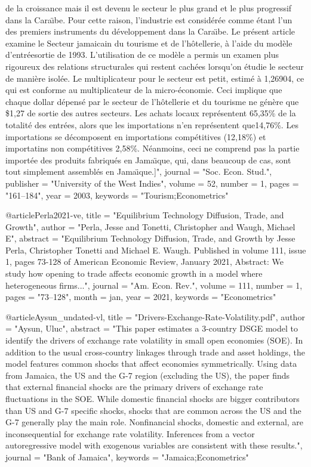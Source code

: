 {{	de la croissance mais il est devenu le secteur le plus grand et
	le plus progressif dans la Cara{\"\i}be. Pour cette raison,
	l'industrie est consid{\'e}r{\'e}e comme {\'e}tant l'un des
	premiers instruments du d{\'e}veloppement dans la Cara{\"\i}be.
	Le pr{\'e}sent article examine le Secteur jamaicain du tourisme
	et de l'h{\^o}tellerie, {\`a} l'aide du mod{\`e}le
	d'entr{\'e}esortie de 1993. L'utilisation de ce mod{\`e}le a
	permis un examen plus rigoureux des relations structurales qui
	restent cach{\'e}es lorsqu'on {\'e}tudie le secteur de
	mani{\`e}re isol{\'e}e. Le multiplicateur pour le secteur est
	petit, estim{\'e} {\`a} 1,26904, ce qui est conforme au
	multiplicateur de la micro-{\'e}conomie. Ceci implique que
	chaque dollar d{\'e}pens{\'e} par le secteur de l'h{\^o}tellerie
	et du tourisme ne g{\'e}n{\`e}re que \$1,27 de sortie des autres
	secteurs. Les achats locaux repr{\'e}sentent 65,35\% de la
	totalit{\'e} des entr{\'e}es, alors que les importations n'en
	repr{\'e}sentent que14,76\%. Les importations se d{\'e}composent
	en importations comp{\'e}titives (12,18\%) et importatins non
	comp{\'e}titives 2,58\%. N{\'e}anmoins, ceci ne comprend pas la
	partie import{\'e}e des produits fabriqu{\'e}s en Jama{\"\i}que,
	qui, dans beaucoup de cas, sont tout simplement assembl{\'e}s en
	Jama{\"\i}que.]",
	journal   = "Soc. Econ. Stud.",
	publisher = "University of the West Indies",
	volume    =  52,
	number    =  1,
	pages     = "161--184",
	year      =  2003,
	keywords  = "Tourism;Econometrics"
}

@article{Perla2021-ve,
	title    = "Equilibrium Technology Diffusion, Trade, and Growth",
	author   = "Perla, Jesse and Tonetti, Christopher and Waugh, Michael E",
	abstract = "Equilibrium Technology Diffusion, Trade, and Growth by Jesse
	Perla, Christopher Tonetti and Michael E. Waugh. Published in
	volume 111, issue 1, pages 73-128 of American Economic Review,
	January 2021, Abstract: We study how opening to trade affects
	economic growth in a model where heterogeneous firms...",
	journal  = "Am. Econ. Rev.",
	volume   =  111,
	number   =  1,
	pages    = "73--128",
	month    =  jan,
	year     =  2021,
	keywords = "Econometrics"
}

@article{Aysun_undated-vl,
	title    = "{Drivers-Exchange-Rate-Volatility.pdf}",
	author   = "Aysun, Uluc",
	abstract = "This paper estimates a 3-country DSGE model to identify the
	drivers of exchange rate volatility in small open economies
	(SOE). In addition to the usual cross-country linkages through
	trade and asset holdings, the model features common shocks that
	affect economies symmetrically. Using data from Jamaica, the US
	and the G-7 region (excluding the US), the paper finds that
	external financial shocks are the primary drivers of exchange
	rate fluctuations in the SOE. While domestic financial shocks are
	bigger contributors than US and G-7 specific shocks, shocks that
	are common across the US and the G-7 generally play the main
	role. Nonfinancial shocks, domestic and external, are
	inconsequential for exchange rate volatility. Inferences from a
	vector autoregressive model with exogenous variables are
	consistent with these results.",
	journal  = "Bank of Jamaica",
	keywords = "Jamaica;Econometrics"
}

}
